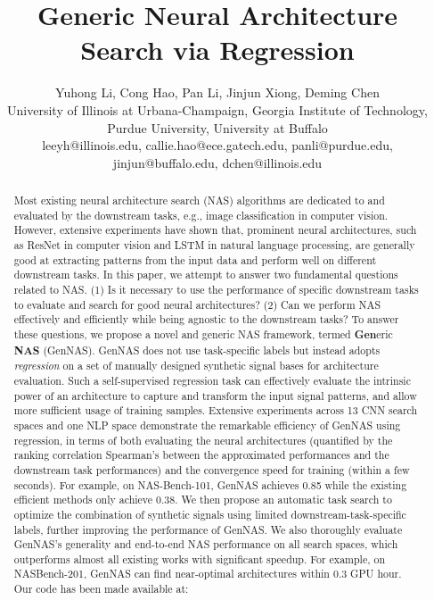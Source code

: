 \documentclass{article}
\title{Generic Neural Architecture Search via Regression}
\author{Yuhong Li, Cong Hao, Pan Li, Jinjun Xiong, Deming Chen\\
 University of Illinois at Urbana-Champaign,
 Georgia Institute of Technology,\\ Purdue University,
 University at Buffalo \\
 leeyh@illinois.edu, callie.hao@ece.gatech.edu, panli@purdue.edu, \\
 jinjun@buffalo.edu, dchen@illinois.edu
}
\begin{document}
\maketitle
\begin{abstract}
Most existing neural architecture search (NAS) algorithms are dedicated to and evaluated by the downstream tasks, e.g., image classification in computer vision. 
However, extensive experiments have shown that, prominent neural architectures, such as ResNet in computer vision and LSTM in natural language processing, are generally good at extracting patterns from the input data and perform well on different downstream tasks. 
In this paper, we attempt to answer two fundamental questions related to NAS. (1) Is it necessary to use the performance of specific downstream tasks to evaluate and search for good neural architectures? (2) Can we perform NAS effectively and efficiently while being agnostic to the downstream tasks?
To answer these questions, we propose a novel and generic NAS framework, termed \textbf{Gen}eric \textbf{NAS} (GenNAS). 
GenNAS does not use task-specific labels but instead adopts \textit{regression} on a set of manually designed synthetic signal bases for architecture evaluation. 
Such a self-supervised regression task can effectively evaluate the intrinsic power of an architecture to capture and transform the input signal patterns, 
and allow more sufficient usage of training samples. Extensive experiments across 13 CNN search spaces and one NLP space demonstrate the remarkable efficiency of GenNAS using regression, in terms of both evaluating the neural architectures (quantified by the ranking correlation Spearman's  between the approximated performances and the downstream task performances) and the convergence speed for training (within a few seconds). For example, on NAS-Bench-101, GenNAS achieves 0.85  while the existing efficient methods only achieve 0.38.
We then propose an automatic task search to optimize the combination of synthetic signals using limited downstream-task-specific labels, further improving the performance of GenNAS.
We also thoroughly evaluate GenNAS's generality and end-to-end NAS performance on all search spaces,
which outperforms almost all existing works with significant speedup. For example, on NASBench-201, GenNAS can find near-optimal architectures within 0.3 GPU hour. Our code has been
made available at: \href{https://github.com/leeyeehoo/GenNAS}{\textit{\color{magenta}{https://github.com/leeyeehoo/GenNAS}}}

\end{abstract}
\end{document}
